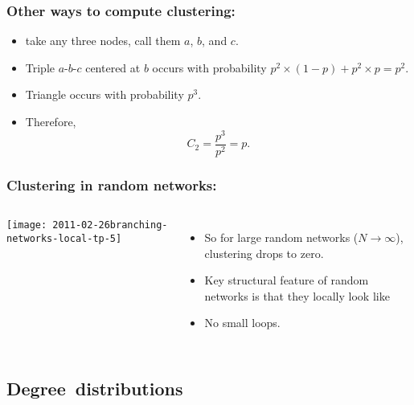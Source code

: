 \begin{frame}
  \frametitle{Other ways to compute clustering:}

  \begin{itemize}
  \item<1->
     take any three nodes, call them $a$, $b$, and $c$.
  \item<2->
    Triple $a$-$b$-$c$ centered at $b$ occurs with probability
    $p^2 \times (1-p) + p^2 \times p = p^2$.
  \item<3->
    Triangle occurs with probability $p^3$.
  \item<4->
    Therefore, 
    $$
    C_2 = \frac{p^3}{p^2} = p.
    $$
  \end{itemize}

\end{frame}

\begin{frame}
  \frametitle{Clustering in random networks:}
  
  \begin{columns}
    \texttt{[image: 2011-02-26branching-networks-local-tp-5]}
    \begin{itemize}
    \item<1-> 
      So for large random networks ($N \rightarrow \infty$),
      clustering drops to zero.
    \item<2-> 
      Key structural feature of random networks is that
      they locally look like\\ 
    \item<3-> 
      No small loops.
    \end{itemize}
  \end{columns}

\end{frame}

\subsection{Degree\ distributions}

